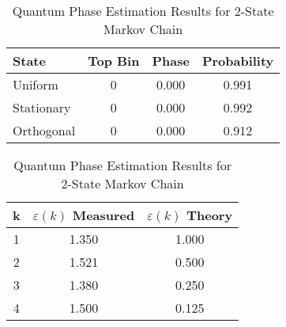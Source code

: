 \begin{table}[h]
\centering
\caption{Quantum Phase Estimation Results for 2-State Markov Chain}
\begin{tabular}{|l|c|c|c|}
\hline
\textbf{State} & \textbf{Top Bin} & \textbf{Phase} & \textbf{Probability} \\
\hline
Uniform & 0 & 0.000 & 0.991 \\
Stationary & 0 & 0.000 & 0.992 \\
Orthogonal & 0 & 0.000 & 0.912 \\
\hline
\end{tabular}

\vspace{1em}

\begin{tabular}{|c|c|c|}
\hline
\textbf{k} & \textbf{$\varepsilon(k)$ Measured} & \textbf{$\varepsilon(k)$ Theory} \\
\hline
1 & 1.350 & 1.000 \\
2 & 1.521 & 0.500 \\
3 & 1.380 & 0.250 \\
4 & 1.500 & 0.125 \\
\hline
\end{tabular}
\label{tab:qpe_results}
\end{table}